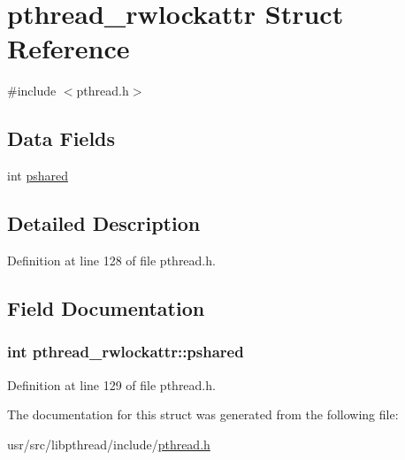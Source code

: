 \hypertarget{structpthread__rwlockattr}{\section{pthread\+\_\+rwlockattr Struct Reference}
\label{structpthread__rwlockattr}
}


{\ttfamily \#include $<$pthread.\+h$>$}

\subsection*{Data Fields}
\begin{DoxyCompactItemize}
\item 
int \hyperlink{structpthread__rwlockattr_a8a113eba0407c92f6302fada4c4d7419}{pshared}
\end{DoxyCompactItemize}


\subsection{Detailed Description}


Definition at line 128 of file pthread.\+h.



\subsection{Field Documentation}
\hypertarget{structpthread__rwlockattr_a8a113eba0407c92f6302fada4c4d7419}{
\subsubsection[{pshared}]{\setlength{\rightskip}{0pt plus 5cm}int pthread\+\_\+rwlockattr\+::pshared}}\label{structpthread__rwlockattr_a8a113eba0407c92f6302fada4c4d7419}


Definition at line 129 of file pthread.\+h.



The documentation for this struct was generated from the following file\+:\begin{DoxyCompactItemize}
\item 
usr/src/libpthread/include/\hyperlink{pthread_8h}{pthread.\+h}\end{DoxyCompactItemize}
